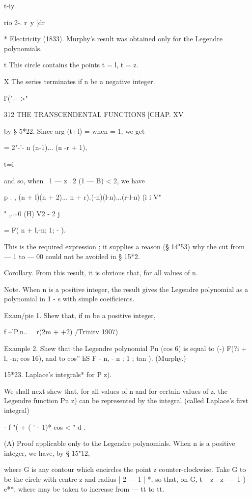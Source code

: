 {{ t-iy 

rio 2-. r\ y [dr      

* Electricity (1833). Murphy's result was obtained only for the Legendre polynomials. 

t This circle contains the points t = l, t = z. 

X The series terminates if n be a negative integer. 



l'('+ >" 



312 THE TRANSCENDENTAL FUNCTIONS [CHAP. XV 

by § 5*22. Since arg (t+l) = when   = 1, we get 

= 2"-'- n (n-1)... (n -r + 1), 

t=i 

and so, when \ 1 — z \  2 (1 — B) < 2, we have 

p . ,   (n + l)(n + 2)... n + r).(-n)(l-n)...(r-l-n) (i i V" 

   " ,.=0 (H)  V2 - 2   j 

= F( n + l,-n; 1;  - ). 

This is the required expression ; it supplies a reason (§ 14"53) why the cut 
from — 1 to — 00 could not be avoided in § 15*2. 

Corollary. From this result, it is obvious that, for all values of n. 

Note. When n is a positive integer, the result gives the Legendre polynomial as 
a polynomial in 1 - s with simple coeificients. 

Exam/pie 1. Shew that, if m be a positive integer, 

f --'P.n..  \ \  r(2m +  +2) /Trinitv 1907) 

Example 2. Shew that the Legendre polynomial Pn (cos 6) is equal to 
(-) F(?i + l, -n; \; cos  16), 
and to cos'' hS F   - n, - n ; 1 ; tan  ). (Murphy.) 

15*23. Laplace's integrals* for P   z). 

We shall next shew that, for all values of n and for certain values of z, 
the Legendre function Pn  z) can be represented by the integral (called 
Laplace's first integral) 

- f "(  + ( ' - 1)* cos <  " d . 

(A) Proof applicable only to the Legendre polynomials. 
When n is a positive integer, we have, by § 15"12, 

where G is any contour which encircles the point z counter-clockwise. 
Take G to be the circle with centre z and radius | 2  — 1 | *, so that, on G, 
t ~ z -   z- — 1 )  e**, where may be taken to increase from — tt to tt. 

}}
